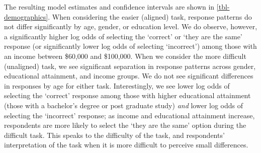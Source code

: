 \documentclass[
]{jds}
\begin{document}
The resulting model estimates and confidence intervals are shown in
\autoref{tbl-demographics}. When considering the easier (aligned) task,
response patterns do not differ significantly by age, gender, or
education level. We do observe, however, a significantly higher log odds
of selecting the `correct' or `they are the same' response (or
significantly lower log odds of selecting `incorrect') among those with
an income between \$60,000 and \$100,000. When we consider the more
difficult (unaligned) task, we see significant separation in response
patterns across gender, educational attainment, and income groups. We do
not see significant differences in responses by age for either task.
Interestingly, we see lower log odds of selecting the `correct' response
among those with higher educational attainment (those with a bachelor's
degree or post graduate study) \emph{and} lower log odds of selecting
the `incorrect' response; as income and educational attainment increase,
respondents are more likely to select the `they are the same' option
during the difficult task. This speaks to the difficulty of the task,
and respondents' interpretation of the task when it is more difficult to
perceive small differences.

\blandscape
\end{document}
